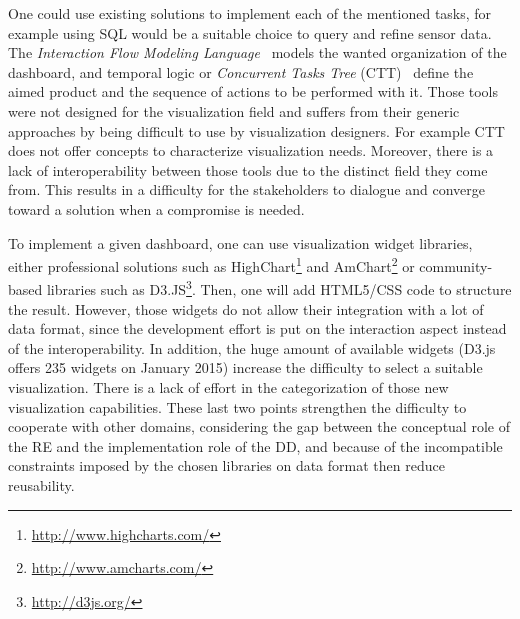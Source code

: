 \documentclass{sigplanconf}
\begin{document}
One could use existing solutions to implement each of the mentioned
tasks, for example using SQL would be a suitable choice to query and
refine sensor data. The \emph{Interaction Flow Modeling
  Language}~\cite{ifml} models the wanted organization of the
dashboard, and temporal logic or \emph{Concurrent Tasks Tree}
(CTT)~\cite{ctt} define the aimed product and the sequence of actions
to be performed with it.
Those tools were not designed for the visualization field and suffers
from their generic approaches by being difficult to use by
visualization designers. For example CTT does not offer concepts to
characterize visualization needs.
Moreover, there is a lack of interoperability between those tools due
to the distinct field they come from. This results in a difficulty for
the stakeholders to dialogue and converge toward a solution when a
compromise is needed.

To implement a given dashboard, one can use visualization widget
libraries, either professional solutions such as
HighChart\footnote{\url{http://www.highcharts.com/}} and
AmChart\footnote{\url{http://www.amcharts.com/}} or com\-munity-based
libraries such as D3.JS\footnote{\url{http://d3js.org/}}. Then, one
will add HTML5/CSS code to structure the result.
However, those widgets do not allow their integration with a lot of
data format, since the development effort is put on the interaction
aspect instead of the interoperability. In addition, the huge amount
of available widgets (\eg D3.js offers 235 widgets on January 2015)
increase the difficulty to select a suitable visualization. There is 
a lack of effort in the categorization of those new visualization
capabilities\cite{ecmfa}.  These last two points strengthen the
difficulty to cooperate with other domains, considering the gap
between the conceptual role of the RE and the implementation role of
the DD, and because of the incompatible constraints imposed by the chosen
libraries on data format then reduce reusability.
\end{document}
